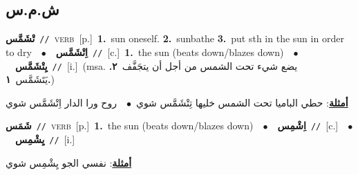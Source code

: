 \documentclass[10pt,a4paper,twoside]{article} %
\begin{document}
\begin{multicols}{2}
\vspace{-3mm}
\subsection*{\color{blue}\foreignlanguage{arabic}{ش.م.س}\color{blue}{}} 

{\setlength\topsep{0pt}\textbf{\foreignlanguage{arabic}{تْشَمَّس}}\ {\color{gray}\texttt{//}\color{black}}\ \textsc{verb}\ [p.]\ \textbf{1.}~sun oneself.  \textbf{2.}~sunbathe  \textbf{3.}~put sth in the sun in order to dry\ \ $\bullet$\ \ \setlength\topsep{0pt}\textbf{\foreignlanguage{arabic}{اِتْشَمَّس}}\ {\color{gray}\texttt{//}\color{black}}\ [c.]\ \textbf{1.}~the sun (beats down/blazes down)\ \ $\bullet$\ \ \setlength\topsep{0pt}\textbf{\foreignlanguage{arabic}{يِتْشَمَّس}}\ {\color{gray}\texttt{//}\color{black}}\ [i.]\ \color{gray}(msa. \foreignlanguage{arabic}{يضع شيء تحت الشمس من أجل أن يتجَفَّف}~\foreignlanguage{arabic}{\textbf{٢.}}  \foreignlanguage{arabic}{يَتَشَمَّس}~\foreignlanguage{arabic}{\textbf{١.}})\color{black}\  \begin{flushright}\color{gray}\foreignlanguage{arabic}{\textbf{\underline{\foreignlanguage{arabic}{أمثلة}}}: حطي الباميا تحت الشمس خليها تِتْشَمَّس شوي\ $\bullet$\ \  روح ورا الدار اِتْشَمَّس شوي}\end{flushright}\color{black}} \vspace{2mm}

{\setlength\topsep{0pt}\textbf{\foreignlanguage{arabic}{شَمَس}}\ {\color{gray}\texttt{//}\color{black}}\ \textsc{verb}\ [p.]\ \textbf{1.}~the sun (beats down/blazes down)\ \ $\bullet$\ \ \setlength\topsep{0pt}\textbf{\foreignlanguage{arabic}{اِشْمِس}}\ {\color{gray}\texttt{//}\color{black}}\ [c.]\ \ $\bullet$\ \ \setlength\topsep{0pt}\textbf{\foreignlanguage{arabic}{يِشْمِس}}\ {\color{gray}\texttt{//}\color{black}}\ [i.]\  \begin{flushright}\color{gray}\foreignlanguage{arabic}{\textbf{\underline{\foreignlanguage{arabic}{أمثلة}}}: نفسي الجو يِشْمِس شوي}\end{flushright}\color{black}} \vspace{2mm}


\end{multicols}
\end{document}
